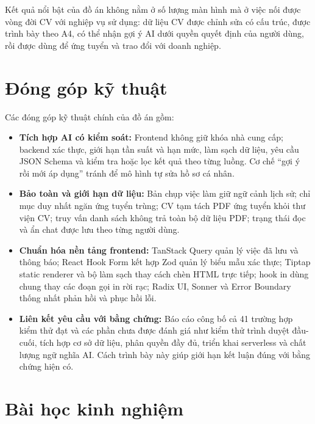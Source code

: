 Kết quả nổi bật của đồ án không nằm ở số lượng màn hình mà ở việc nối được vòng đời CV với nghiệp vụ sử dụng: dữ liệu CV được chỉnh sửa có cấu trúc, được trình bày theo A4, có thể nhận gợi ý AI dưới quyền quyết định của người dùng, rồi được dùng để ứng tuyển và trao đổi với doanh nghiệp.

\section{Đóng góp kỹ thuật}

Các đóng góp kỹ thuật chính của đồ án gồm:

\begin{itemize}
    \item \textbf{Tích hợp AI có kiểm soát:} Frontend không giữ khóa nhà cung cấp; backend xác thực, giới hạn tần suất và hạn mức, làm sạch dữ liệu, yêu cầu JSON Schema và kiểm tra hoặc lọc kết quả theo từng luồng. Cơ chế ``gợi ý rồi mới áp dụng'' tránh để mô hình tự sửa hồ sơ cá nhân.

    \item \textbf{Bảo toàn và giới hạn dữ liệu:} Bản chụp việc làm giữ ngữ cảnh lịch sử; chỉ mục duy nhất ngăn ứng tuyển trùng; CV tạm tách PDF ứng tuyển khỏi thư viện CV; truy vấn danh sách không trả toàn bộ dữ liệu PDF; trạng thái đọc và ẩn chat được lưu theo từng người dùng.

    \item \textbf{Chuẩn hóa nền tảng frontend:} TanStack Query quản lý việc đã lưu và thông báo; React Hook Form kết hợp Zod quản lý biểu mẫu xác thực; Tiptap static renderer và bộ làm sạch thay cách chèn HTML trực tiếp; hook in dùng chung thay các đoạn gọi in rời rạc; Radix UI, Sonner và Error Boundary thống nhất phản hồi và phục hồi lỗi.

    \item \textbf{Liên kết yêu cầu với bằng chứng:} Báo cáo công bố cả 41 trường hợp kiểm thử đạt và các phần chưa được đánh giá như kiểm thử trình duyệt đầu-cuối, tích hợp cơ sở dữ liệu, phân quyền đầy đủ, triển khai serverless và chất lượng ngữ nghĩa AI. Cách trình bày này giúp giới hạn kết luận đúng với bằng chứng hiện có.
\end{itemize}

\section{Bài học kinh nghiệm}

